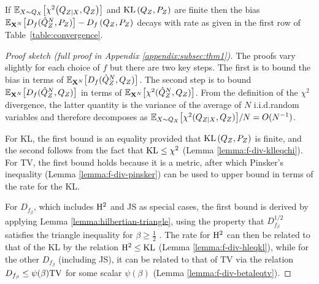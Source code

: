\begin{theorem}\label{thm:fast-KL-rate}
If
$\mathbb{E}_{X\sim Q_X}\bigl[\chi^2\bigl(Q_{Z|X}, Q_Z\bigr)\bigr]$ and
$\mathrm{KL}\left( Q_{Z} , P_Z\right)$ are finite then the bias ${\mathbb{E}_{\mathbf{X}^N}\bigl[D_f( \hat{Q}_Z^N , P_Z)\bigr] - D_f\left( Q_{Z} , P_Z\right)}$ decays with rate as given in the first row of Table~\ref{table:convergence}.
\end{theorem}
\begin{proof}[Proof sketch (full proof in Appendix \ref{appendix:subsec:thm1})]
The proofs vary slightly for each choice of $f$ but there are two key steps. 
The first is to bound the bias in terms of ${\mathbb{E}_{\mathbf{X}^N}\big[D_f(\hat{Q}_Z^N, Q_Z)\big]}$. 
The second step is to bound ${\mathbb{E}_{\mathbf{X}^N}\bigl[D_f(\hat{Q}_Z^N, Q_Z)\bigr]}$ in terms of ${\mathbb{E}_{\mathbf{X}^N}\bigl[\chi^2(\hat{Q}_Z^N, Q_Z)\bigr]}$.
From the definition of the $\chi^2$ divergence, the latter quantity is the variance of the average of $N$ i.i.d.\:random variables and therefore decomposes as ${\mathbb{E}_{X\sim Q_X}\bigl[\chi^2(Q_{Z|X}, Q_Z)\bigr] / N} = O(N^{-1})$.

For KL, the first bound is an equality provided that $\mathrm{KL}\left( Q_{Z} , P_Z\right)$ is finite, and the second follows from the fact that $\mathrm{KL} \leq \chi^2$ (Lemma \ref{lemma:f-div-klleqchi}).
For TV, the first bound holds because it is a metric, after which Pinsker's inequality (Lemma \ref{lemma:f-div-pinsker}) can be used to upper bound in terms of the rate for the KL.

For ${D_{f_\beta}}$, which includes $\mathrm{H}^2$ and JS as special cases, the first bound is derived by applying Lemma \ref{lemma:hilbertian-triangle}, using the property that $D^{1/2}_{f_\beta}$ satisfies the triangle inequality for $\beta \geq \frac{1}{2}$ \citep{hein05hilbertian}.
The rate for $\mathrm{H}^2$ can then be related to that of the KL by the relation $\mathrm{H}^2 \leq \mathrm{KL}$ (Lemma \ref{lemma:f-div-hleqkl}), while for the other $D_{f_\beta}$ (including JS), it can be related to that of TV via the relation $D_{f_\beta} \leq \psi(\beta) \mathrm{TV}$ for some scalar $\psi(\beta)$ (Lemma \ref{lemma:f-div-betaleqtv}).
\end{proof}

\medskip


